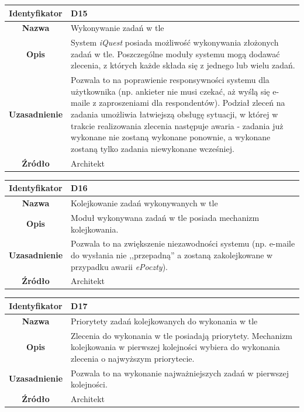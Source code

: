 \begin{table}[H]
\centering
\begin{tabular}{ | >{\bfseries}c | p{11cm} | }
\hline
%
Identyfikator & D15 \\ \hline
Nazwa & Wykonywanie zadań w tle \\ \hline
Opis & System \textit{iQuest} posiada możliwość wykonywania złożonych zadań w tle. Poszczególne moduły systemu mogą dodawać zlecenia, z których każde składa się z jednego lub wielu zadań. \\ \hline
Uzasadnienie & Pozwala to na poprawienie responsywności systemu dla użytkownika (np. ankieter nie musi czekać, aż wyślą się e-maile z zaproszeniami dla respondentów). Podział zleceń na zadania umożliwia łatwiejszą obsługę sytuacji, w której w trakcie realizowania zlecenia następuje awaria - zadania już wykonane nie zostaną wykonane ponownie, a wykonane zostaną tylko zadania niewykonane wcześniej. \\ \hline
Źródło & Architekt \\ \hline
%
\end{tabular}
\end{table}

\begin{table}[H]
\centering
\begin{tabular}{ | >{\bfseries}c | p{11cm} | }
\hline
%
Identyfikator & D16 \\ \hline
Nazwa & Kolejkowanie zadań wykonywanych w tle \\ \hline
Opis & Moduł wykonywana zadań w tle posiada mechanizm kolejkowania. \\ \hline
Uzasadnienie & Pozwala to na zwiększenie niezawodności systemu (np. e-maile do wysłania nie ,,przepadną'' a zostaną zakolejkowane w przypadku awarii \textit{ePoczty}). \\ \hline
Źródło & Architekt \\ \hline
%
\end{tabular}
\end{table}

\begin{table}[H]
\centering
\begin{tabular}{ | >{\bfseries}c | p{11cm} | }
\hline
%
Identyfikator & D17 \\ \hline
Nazwa & Priorytety zadań kolejkowanych do wykonania w tle \\ \hline
Opis & Zlecenia do wykonania w tle posiadają priorytety. Mechanizm kolejkowania w pierwszej kolejności wybiera do wykonania zlecenia o najwyższym priorytecie. \\ \hline
Uzasadnienie & Pozwala to na wykonanie najważniejszych zadań w pierwszej kolejności. \\ \hline
Źródło & Architekt \\ \hline
%
\end{tabular}
\end{table}


